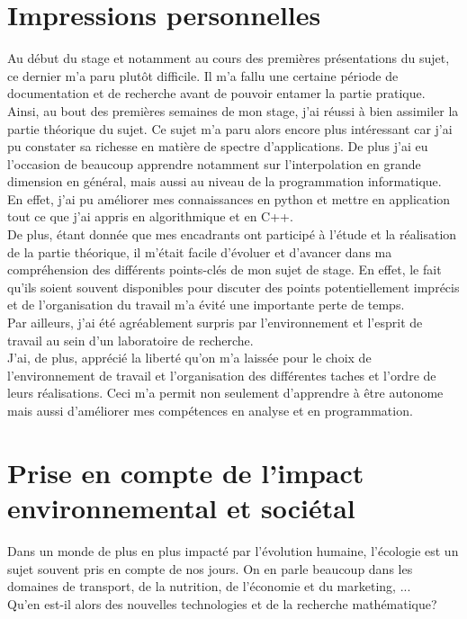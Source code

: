 \section{Impressions personnelles}\label{sec:6}
\hspace{0.5cm}
Au début du stage et notamment au cours des premières présentations du sujet, ce dernier m'a paru plutôt difficile. Il m'a fallu une certaine période de documentation et de recherche avant de pouvoir entamer la partie pratique. Ainsi, au bout des premières semaines de mon stage, j'ai réussi à bien assimiler la partie théorique du sujet. Ce sujet m'a paru alors encore plus intéressant car j'ai pu constater sa richesse en matière de spectre d'applications. De plus j'ai eu l'occasion de beaucoup apprendre notamment sur l'interpolation en grande dimension en général, mais aussi au niveau de la programmation informatique. En effet, j'ai pu améliorer mes connaissances en python et mettre en application tout ce que j'ai appris en algorithmique et en C++.\\
De plus, étant donnée que mes encadrants ont participé à l'étude et la réalisation de la partie théorique, il m'était facile d'évoluer et d'avancer dans ma compréhension des différents points-clés de mon sujet de stage. En effet, le fait qu'ils soient souvent disponibles pour discuter des points potentiellement imprécis et de l'organisation du travail m'a évité une importante perte de temps.\\
Par ailleurs, j'ai été agréablement surpris par l'environnement et l'esprit de travail au sein d'un laboratoire de recherche.\\
J'ai, de plus, apprécié la liberté qu'on m'a laissée pour le choix de l'environnement de travail et l'organisation des différentes taches et l'ordre de leurs réalisations. Ceci m'a permit non seulement d'apprendre à être autonome mais aussi d'améliorer mes compétences en analyse et en programmation.

\section{Prise en compte de l’impact environnemental et sociétal}\label{sec:7}
\hspace{0.5cm}
Dans un monde de plus en plus impacté par l’évolution humaine, l’écologie est un sujet souvent pris en compte de nos jours. On en parle beaucoup dans les domaines de transport, de la nutrition, de l'économie et du marketing, ...\\
Qu’en est-il alors des nouvelles technologies et de la recherche mathématique?\\

